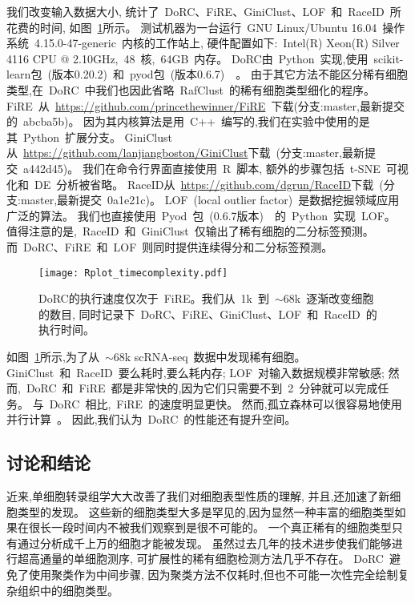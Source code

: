 我们改变输入数据大小,
统计了~DoRC、FiRE、GiniClust、LOF~\cite{breunig2000lof}和~RaceID~所花费的时间,
如图~\ref{fig:timecomplexity}所示。
测试机器为一台运行~GNU Linux/Ubuntu 16.04~操作系统~4.15.0-47-generic~内核的工作站上,
硬件配置如下:~Intel(R) Xeon(R) Silver 4116 CPU @ 2.10GHz,~48~核,~64GB~内存。
DoRC由~Python~实现,使用~scikit-learn包~(版本0.20.2)~\cite{pedregosa2011scikit}和~pyod包~(版本0.6.7)~~\cite{zhao2019pyod}。
由于其它方法不能区分稀有细胞类型,在~DoRC~中我们也因此省略~RafClust~的稀有细胞类型细化的程序。
FiRE~从~\url{https://github.com/princethewinner/FiRE}~下载(分支:master,最新提交的~abcba5b)。
因为其内核算法是用~C++~编写的,我们在实验中使用的是其~Python~扩展分支。
GiniClust从~\url{https://github.com/lanjiangboston/GiniClust}下载~(分支:master,最新提交~a442d45)。
我们在命令行界面直接使用~R~脚本,
额外的步骤包括~t-SNE~可视化和~DE~分析被省略。
RaceID从~\url{https://github.com/dgrun/RaceID}下载~(分支:master,最新提交~0a1e21c)。
LOF~(local outlier factor)~是数据挖掘领域应用广泛的算法。
我们也直接使用~Pyod~包~(0.6.7版本)~\cite{zhao2019pyod}~的~Python~实现~LOF。
值得注意的是,~RaceID~和~GiniClust~仅输出了稀有细胞的二分标签预测。
而~DoRC、FiRE~和~LOF~则同时提供连续得分和二分标签预测。
\begin{figure}[!htbp]
    \centering
    \texttt{[image: Rplot\_timecomplexity.pdf]}
    \caption{
    DoRC的执行速度仅次于~FiRE。我们从~1k~到~${\sim} 68$k~逐渐改变细胞的数目, 同时记录下~DoRC、FiRE、GiniClust、LOF~和~RaceID~的执行时间。    
    }
    \label{fig:timecomplexity}
\end{figure}

如图~\ref{fig:timecomplexity}所示,为了从~${\sim}68$k scRNA-seq~数据中发现稀有细胞。 
GiniClust~和~RaceID~要么耗时,要么耗内存;
LOF~对输入数据规模非常敏感;
然而,~DoRC~和~FiRE~都是非常快的,因为它们只需要不到~2~分钟就可以完成任务。
与~DoRC~相比,~FiRE~的速度明显更快。
然而,孤立森林可以很容易地使用并行计算~\cite{hariri2018batch}。
因此,我们认为~DoRC~的性能还有提升空间。

\subsection{讨论和结论}
近来,单细胞转录组学大大改善了我们对细胞表型性质的理解,
并且,还加速了新细胞类型的发现。
这些新的细胞类型大多是罕见的,因为显然一种丰富的细胞类型如果在很长一段时间内不被我们观察到是很不可能的。
一个真正稀有的细胞类型只有通过分析成千上万的细胞才能被发现。
虽然过去几年的技术进步使我们能够进行超高通量的单细胞测序,
可扩展性的稀有细胞检测方法几乎不存在。
DoRC~避免了使用聚类作为中间步骤,
因为聚类方法不仅耗时,但也不可能一次性完全绘制复杂组织中的细胞类型。

